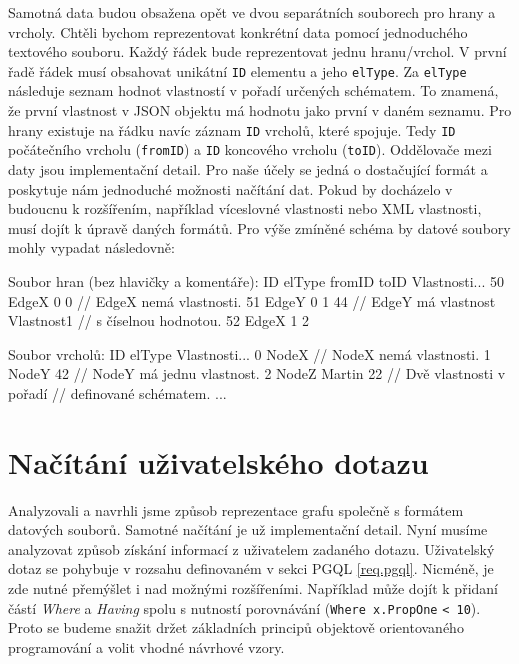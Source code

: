 Samotná data budou obsažena opět ve dvou separátních souborech pro hrany a vrcholy.
Chtěli bychom reprezentovat konkrétní data pomocí jednoduchého textového souboru.
Každý řádek bude reprezentovat jednu hranu/vrchol.
V první řadě řádek musí obsahovat unikátní \verb+ID+ elementu a jeho \verb+elType+. 
Za \verb+elType+ následuje seznam hodnot vlastností v pořadí určených schématem.
To znamená, že první vlastnost v JSON objektu má hodnotu jako první v daném seznamu.
Pro hrany existuje na řádku navíc záznam \verb+ID+ vrcholů, které spojuje.
Tedy \texttt{ID} počátečního vrcholu (\texttt{fromID}) a \texttt{ID} koncového vrcholu (\texttt{toID}). 
Oddělovače mezi daty jsou implementační detail.
Pro naše účely se jedná o dostačující formát a poskytuje nám jednoduché možnosti načítání dat.
Pokud by docházelo v budoucnu k rozšířením, například víceslovné vlastnosti nebo XML vlastnosti, musí dojít k úpravě daných formátů.
Pro výše zmíněné schéma by datové soubory mohly vypadat následovně:
\begin{code}
Soubor hran (bez hlavičky a komentáře):
ID elType fromID toID Vlastnosti... 
50 EdgeX 0 0    // EdgeX nemá vlastnosti.
51 EdgeY 0 1 44 // EdgeY má vlastnost Vlastnost1
                // s číselnou hodnotou.
52 EdgeX 1 2   
\end{code}
\begin{code}
Soubor vrcholů:
ID elType Vlastnosti...
0 NodeX    // NodeX nemá vlastnosti.
1 NodeY 42 // NodeY má jednu vlastnost.
2 NodeZ Martin 22 // Dvě vlastnosti v pořadí
                  // definované schématem.
...
\end{code}

\section{Načítání uživatelského dotazu} \label{anal.parsing}

Analyzovali a navrhli jsme způsob reprezentace grafu společně s formátem datových souborů.
Samotné načítání je už implementační detail.
Nyní musíme analyzovat způsob získání informací z uživatelem zadaného dotazu. 
Uživatelský dotaz se pohybuje v rozsahu definovaném v sekci PGQL \ref{req.pgql}.
Nicméně, je zde nutné přemýšlet i nad možnými rozšířeními.
Například může dojít k přidaní částí \textit{Where} a \textit{Having} spolu s nutností porovnávání (\texttt{Where x.PropOne} \texttt{< 10}).
Proto se budeme snažit držet základních principů objektově orientovaného programování a volit vhodné návrhové vzory.

